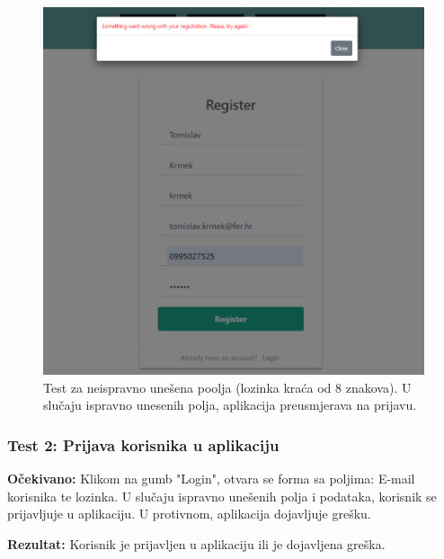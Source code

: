 				\begin{figure}[H]
		 			\begin{center}
		 				\includegraphics[width=15cm]{slike/neispravna_forma_registracija.PNG}
		 			\end{center}
		 			\caption{Test za neispravno unešena poolja (lozinka kraća od 8 znakova). U slučaju ispravno unesenih polja, aplikacija preusmjerava na prijavu.}
		 			\label{fig:inttest}
		 		\end{figure}
			\subsubsection{Test 2: Prijava korisnika u aplikaciju}
			\textbf{Očekivano:} Klikom na gumb "Login", otvara se forma sa poljima: E-mail korisnika te lozinka. U slučaju ispravno unešenih polja i podataka, korisnik se prijavljuje u aplikaciju. U protivnom, aplikacija dojavljuje grešku.
			
			\noindent\textbf{Rezultat:} Korisnik je prijavljen u aplikaciju ili je dojavljena greška.
			
